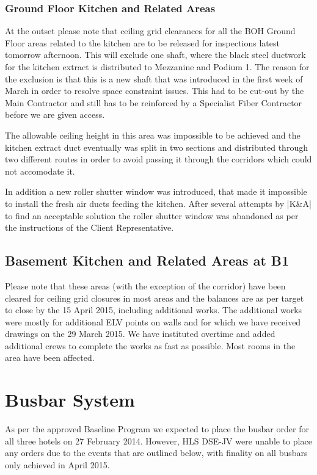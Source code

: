 \subsection{Ground Floor Kitchen and Related Areas}

At the outset please note that ceiling grid clearances for all the BOH Ground Floor areas related to the kitchen are to be released for inspections latest tomorrow afternoon. This will exclude one shaft, where the black steel ductwork for the kitchen extract is distributed to Mezzanine and Podium 1. The reason for the exclusion is that this is a new shaft that was introduced in the first week of March in order to resolve space constraint issues. This had to be cut-out by the Main Contractor and still has to be reinforced by a Specialist Fiber Contractor before we are given access.

The allowable ceiling height in this area was impossible to be achieved and the kitchen extract duct eventually was split in two sections and distributed through two different routes in order to avoid passing it through the corridors which could not accomodate it.

In addition a new roller shutter window was introduced, that made it impossible to install the fresh air ducts feeding the kitchen. After several attempts by |K&A| to find an acceptable solution the roller shutter  window was abandoned as per the instructions of the Client Representative. 

\section{Basement Kitchen and Related Areas at B1}

Please note that these areas (with the exception of the corridor) have been cleared for ceiling grid closures in most areas and the balances are as per target to close by the 15 April 2015, including additional works. The additional works were mostly for additional ELV points on walls and for which we have received drawings on the 29 March 2015. We have instituted overtime and added additional crews to complete the works as fast as possible. Most rooms in the area have been affected. 



\chapter{Busbar System}

As per the approved Baseline Program we expected to place the busbar order for all three hotels on 27 February 2014. However, HLS DSE-JV were unable to place any orders due to the events that are outlined below, with finality on all busbars only achieved in April 2015. 

